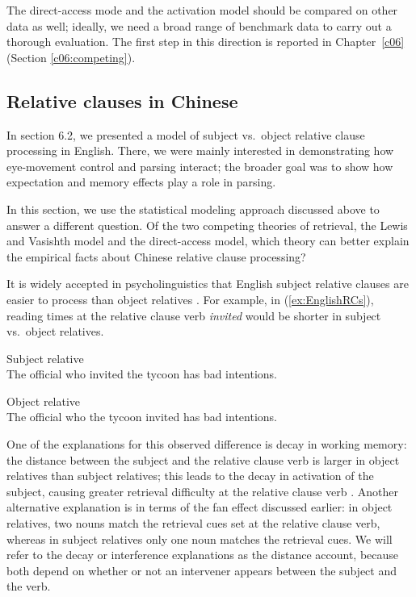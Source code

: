 \documentclass{cambridge7A}\usepackage[]{graphicx}\usepackage[]{color}
\begin{document}
The direct-access mode and the activation model should be compared on other data as well; ideally, we need a  broad range of benchmark data to carry out a thorough evaluation.  The first step in this direction is reported in Chapter~\ref{c06} (Section \ref{c06:competing}).

\subsection{Relative clauses in Chinese} \label{rchinese}

In section 6.2, we presented a model of subject vs.\ object relative clause processing in English. There, we were mainly interested in demonstrating how eye-movement control and parsing interact; the broader goal was to show how expectation and memory effects play a role in parsing.

In this section, we use the statistical modeling approach discussed above to answer a different question. Of the two competing theories of retrieval, the Lewis and Vasishth model and the direct-access model, which theory can better explain the empirical facts about Chinese   relative clause processing?

It is widely accepted in psycholinguistics that  English  subject relative clauses are easier to process than  object relatives \citep[e.g.,][]{grodner}. For example, in (\ref{ex:EnglishRCs}), reading times at the relative clause verb \textit{invited} would be shorter in  subject vs.\ object relatives.

\begin{exe}
\ex  \label{ex:EnglishRCs}
\begin{xlist}
\item Subject relative\\
The official who invited the tycoon has bad intentions.
\item 
Object relative \\
The official who the tycoon invited has bad intentions.
\end{xlist}
\end{exe}

One of the explanations for this observed difference is decay in  working memory: the distance between the subject and the relative clause verb is larger in object relatives than subject relatives; this leads to the decay in activation of the subject, causing greater retrieval difficulty at the relative clause verb \citep{Gibson2000}. Another alternative explanation is in terms of the  fan effect discussed earlier: in object relatives, two nouns match the retrieval cues  set at the relative clause verb, whereas in subject relatives only one noun matches the retrieval cues. We will refer to the decay or interference explanations as the  distance account, because both depend on whether or not an intervener appears between the subject and the verb.
\end{document}
